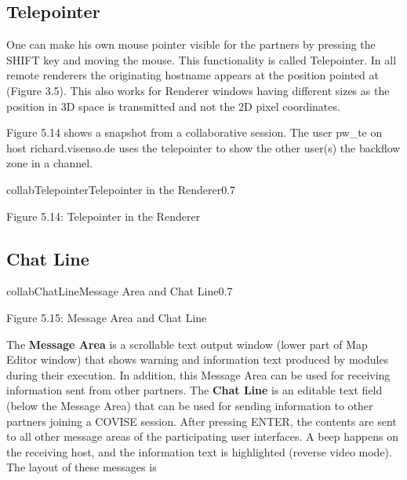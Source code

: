 \subsection{Telepointer}

One can make his own mouse pointer visible for the partners by pressing the SHIFT key 
and moving the mouse. This functionality is called Telepointer. In all remote renderers 
the originating hostname appears at the position pointed at (Figure 3.5). This also works
for Renderer windows having different sizes as the position in 3D space is transmitted 
and not the 2D pixel coordinates. 

Figure 5.14 shows a snapshot from a collaborative session. The 
user pw\_te on host richard.visenso.de uses the telepointer to show the other user(s) the 
backflow zone in a channel. 

\begin{covimg}{collab}{Telepointer}{Telepointer in the Renderer}{0.7}\end{covimg}
\begin{htmlonly}
Figure 5.14: Telepointer in the Renderer
\vspace{0.5cm}
\end{htmlonly}
\clearpage

\subsection{Chat Line}

\begin{covimg}{collab}{ChatLine}{Message Area and Chat Line}{0.7}\end{covimg}
\begin{htmlonly}
Figure 5.15: Message Area and Chat Line
\vspace{0.5cm}
\end{htmlonly}

The {\bf Message Area} is a scrollable text output window (lower part of Map Editor window) that shows warning and
information text produced by modules during their execution. In addition, this Message Area can be used for receiving
information sent from other partners. The {\bf Chat Line} is an editable text field (below the Message Area) that can be used
for sending information to other partners joining a COVISE session. After pressing ENTER, the contents are sent to all other
message areas of the participating user interfaces. A beep happens on the receiving host, and the information text is
highlighted (reverse video mode). The layout of these messages is

